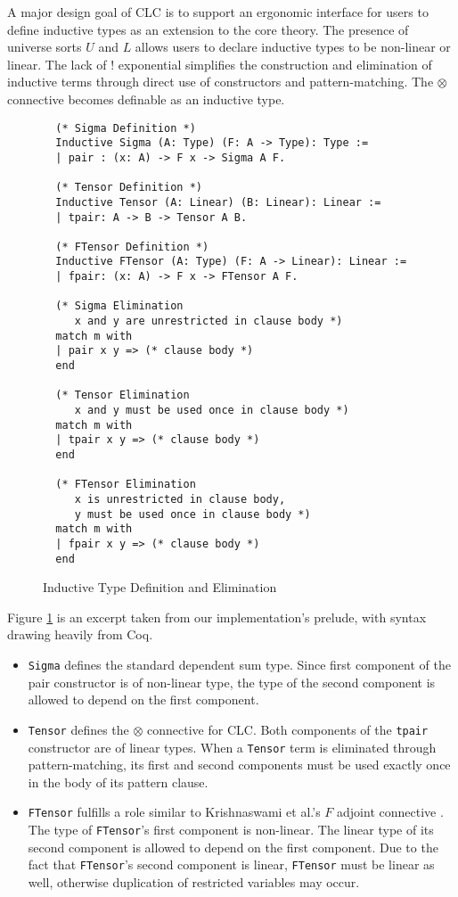 \documentclass[sigplan,screen]{acmart}
\theoremstyle{definition}
\begin{document}
  A major design goal of CLC is to support an ergonomic interface for users to define inductive types \cite{inductive,cic} as an extension to the core theory. The presence of universe sorts $U$ and $L$ allows users to declare inductive types to be non-linear or linear. The lack of ! exponential simplifies the construction and elimination of inductive terms through direct use of constructors and pattern-matching. The $\otimes$ connective becomes definable as an inductive type.

  \begin{figure}[h]
  \vspace{-1.2em}
  \caption{Inductive Type Definition and Elimination}
  \begin{lstlisting}
  (* Sigma Definition *)
  Inductive Sigma (A: Type) (F: A -> Type): Type :=
  | pair : (x: A) -> F x -> Sigma A F.

  (* Tensor Definition *)
  Inductive Tensor (A: Linear) (B: Linear): Linear :=
  | tpair: A -> B -> Tensor A B.

  (* FTensor Definition *)
  Inductive FTensor (A: Type) (F: A -> Linear): Linear :=
  | fpair: (x: A) -> F x -> FTensor A F.

  (* Sigma Elimination
     x and y are unrestricted in clause body *)
  match m with
  | pair x y => (* clause body *)
  end

  (* Tensor Elimination
     x and y must be used once in clause body *)
  match m with
  | tpair x y => (* clause body *)
  end

  (* FTensor Elimination
     x is unrestricted in clause body, 
     y must be used once in clause body *)
  match m with
  | fpair x y => (* clause body *)
  end
  \end{lstlisting}
  \label{inductive}
  \Description{}
  \end{figure}
  
  Figure \ref{inductive} is an excerpt taken from our implementation's prelude, with syntax drawing heavily from Coq.

  \begin{itemize}
    \item \texttt{Sigma} defines the standard dependent sum type. Since first component of the pair constructor is of non-linear type, the type of the second component is allowed to depend on the first component.
    \item \texttt{Tensor} defines the $\otimes$ connective for CLC. Both components of the \texttt{tpair} constructor are of linear types. When a \texttt{Tensor} term is eliminated through pattern-matching, its first and second components must be used exactly once in the body of its pattern clause.
    \item \texttt{FTensor} fulfills a role similar to Krishnaswami et al.'s $F$ adjoint connective \cite{neel15}. The type of \texttt{FTensor}'s first component is non-linear. The linear type of its second component is allowed to depend on the first component. Due to the fact that \texttt{FTensor}'s second component is linear, \texttt{FTensor} must be linear as well, otherwise duplication of restricted variables may occur.
  \end{itemize}
  
\end{document}
